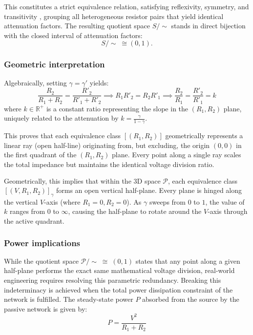 \documentclass[energies,accept,oneauthor,pdftex]{Definitions/mdpi}
\begin{document}
This constitutes a strict equivalence relation, satisfying reflexivity, symmetry, and transitivity \cite{clase_equiv2}, grouping all heterogeneous resistor pairs that yield identical attenuation factors. The resulting quotient space $S/\!\!\sim$ stands in direct bijection with the closed interval of attenuation factors:
\begin{equation}
    S/\!\!\sim \; \cong (0, 1).
\end{equation}


\subsubsection*{Geometric interpretation}
Algebraically, setting $\gamma = \gamma'$ yields:
\[
\frac{R_2}{R_1 + R_2} = \frac{R'_2}{R'_1 + R'_2} \implies R_1 R'_2 = R_2 R'_1 \implies \frac{R_2}{R_1} = \frac{R'_2}{R'_1} = k
\]
where $k \in \mathbb{R}^+$ is a constant ratio representing the slope in the $(R_1, R_2)$ plane, uniquely related to the attenuation by $k = \frac{\gamma}{1 - \gamma}$.

This proves that each equivalence class $[(R_1, R_2)]$ geometrically represents a linear ray (open half-line) originating from, but excluding, the origin $(0,0)$ in the first quadrant of the $(R_1, R_2)$ plane. Every point along a single ray scales the total impedance but maintains the identical voltage division ratio.

Geometrically, this implies that within the 3D space $\mathcal{P}$, each equivalence class $[(V, R_1, R_2)]_\gamma$ forms an open vertical half-plane. Every plane is hinged along the vertical $V$-axis (where $R_1 = 0, R_2 = 0$). As $\gamma$ sweeps from $0$ to $1$, the value of $k$ ranges from $0$ to $\infty$, causing the half-plane to rotate around the $V$-axis through the active quadrant.



\subsubsection*{Power implications}

While the quotient space $\mathcal{P}/\!\!\sim \;\cong\; (0,1)$ states that any point along a given half-plane performs the exact same mathematical voltage division, real-world engineering requires resolving this parametric redundancy. Breaking this indeterminacy is achieved when the total power dissipation constraint of the network is fulfilled. The steady-state power $P$ absorbed from the source by the passive network is given by:
\begin{equation}
P = \frac{V^2}{R_1 + R_2}
\end{equation}
\end{document}
